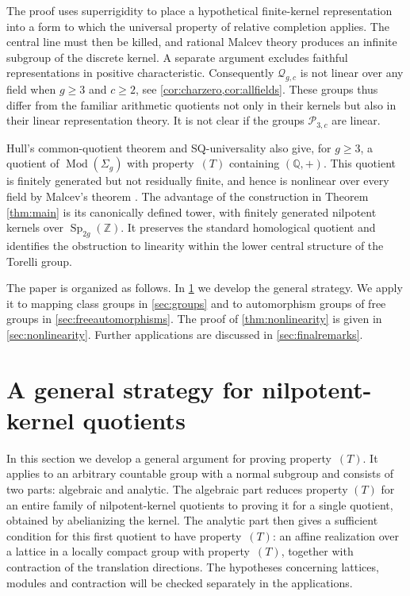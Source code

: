\documentclass[11pt,a4paper]{article}
\theoremstyle{definition}
\newcommand{\Q}{\mathbb Q}
\newcommand{\Z}{\mathbb Z}
\newcommand{\Mod}{\operatorname{Mod}}
\newcommand{\Sp}{\operatorname{Sp}}
\newcommand{\rt}{(T)}
\begin{document}
The proof uses superrigidity to place a hypothetical finite-kernel representation into a form to which the universal property of relative completion applies.
The central line must then be killed, and rational Malcev theory
produces an infinite subgroup of the discrete kernel.
A separate argument excludes faithful representations in
positive characteristic. Consequently \(\mathcal{Q}_{g,c}\)
is not linear over any field when \(g\ge3\) and \(c\ge2\), 
see \cref{cor:charzero,cor:allfields}.
These groups thus differ from the familiar arithmetic quotients
not only in their kernels but also in their linear representation
theory. It is not clear  if the groups 
\(\mathcal{P}_{3,c}\) are linear.

Hull's common-quotient theorem \cite[Corollary~1.6]{Hull} and
SQ-universality \cite[Theorem~8.1(a)]{DGO} also give, for
\(g\ge3\), a quotient of \(\Mod(\Sigma_g)\) with property~\(\rt\)
containing \((\Q,+)\). This quotient is finitely generated but
not residually finite, and hence is nonlinear over every field
by Malcev's theorem \cite{Nica}.
The advantage of the construction in Theorem \ref{thm:main} is its
canonically defined tower, with finitely generated nilpotent
kernels over \(\Sp_{2g}(\Z)\). It preserves the standard homological
quotient and identifies the obstruction to linearity within
the lower central structure of the Torelli group.

The paper is organized as follows. In \cref{sec:general} we
develop the general strategy. We apply it to mapping class
groups in \cref{sec:groups} and to automorphism groups of free
groups in \cref{sec:freeautomorphisms}. The proof of
\cref{thm:nonlinearity} is given in \cref{sec:nonlinearity}.
Further applications are discussed in \cref{sec:finalremarks}.

\tableofcontents

\section{A general strategy for nilpotent-kernel quotients}
\label{sec:general}
\label{sec:permanence}

In this section we develop a general argument for proving property~\(\rt\).
It applies to an arbitrary
countable group with a normal subgroup and consists of two parts: algebraic and analytic. 
The algebraic part reduces property \(\rt\) for
an entire family of nilpotent-kernel quotients to proving it for a single quotient,
obtained by abelianizing the kernel. The analytic part  then gives a
sufficient condition for this first quotient to have
property~\(\rt\): an affine realization over a lattice in a
locally compact group with property~\(\rt\), together with
contraction of the translation directions.
The hypotheses concerning lattices,
modules and contraction will be checked separately in the applications.
\end{document}
